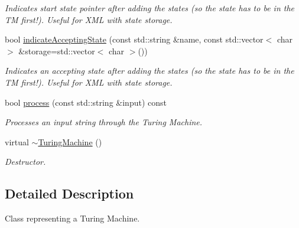 \begin{DoxyCompactItemize}
\begin{DoxyCompactList}\small\item\em Indicates start state pointer after adding the states (so the state has to be in the T\-M first!). Useful for X\-M\-L with state storage. \end{DoxyCompactList}\item 
bool \hyperlink{class_turing_machine_a37b6560f3e0e8e2454dc8bc5dce48fcc}{indicate\-Accepting\-State} (const std\-::string \&name, const std\-::vector$<$ char $>$ \&storage=std\-::vector$<$ char $>$())
\begin{DoxyCompactList}\small\item\em Indicates an accepting state after adding the states (so the state has to be in the T\-M first!). Useful for X\-M\-L with state storage. \end{DoxyCompactList}\item 
bool \hyperlink{class_turing_machine_a69e804d3e6d6b0c4288687a371a5c906}{process} (const std\-::string \&input) const 
\begin{DoxyCompactList}\small\item\em Processes an input string through the Turing Machine. \end{DoxyCompactList}\item 
\hypertarget{class_turing_machine_a5279d180cd87e664447c6b40e0ce55e2}{virtual \hyperlink{class_turing_machine_a5279d180cd87e664447c6b40e0ce55e2}{$\sim$\-Turing\-Machine} ()}\label{class_turing_machine_a5279d180cd87e664447c6b40e0ce55e2}

\begin{DoxyCompactList}\small\item\em Destructor. \end{DoxyCompactList}\end{DoxyCompactItemize}


\subsection{Detailed Description}
Class representing a Turing Machine. 

